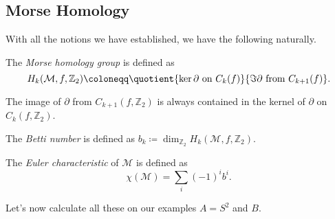 \subsection{Morse Homology}
With all the notions we have established, we have the following naturally.

\begin{definition}\label{def:Morse-homology-group}
	The \emph{Morse homology group} is defined as
	\[
		H_k(\mathcal{M} , f, \mathbb{Z} _2) \coloneqq \quotient{\ker \partial \text{ on } C_k(f)}{\Im \partial  \text{ from } C_{k+1}(f)}.
	\]
\end{definition}

\begin{remark}
	The image of \(\partial \) from \(C_{k+1}(f, \mathbb{Z} _2)\) is always contained in the kernel of \(\partial\) on \(C_k(f, \mathbb{Z} _2)\).
\end{remark}

\begin{definition}\label{def:Betti-number}
	The \emph{Betti number} is defined as \(b_k \coloneqq \dim _{\mathbb{Z} _2}H_k(\mathcal{M} , f, \mathbb{Z} _2)\).
\end{definition}

\begin{definition}\label{def:Euler-characteristic}
	The \emph{Euler characteristic} of \(\mathcal{M} \) is defined as
	\[
		\chi (\mathcal{M} ) = \sum_{i} (-1)^{i} b^i.
	\]
\end{definition}

Let's now calculate all these on our examples \(A = S^2\) and \(B\).

